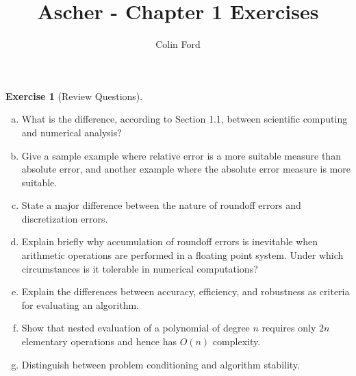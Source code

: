 \documentclass[12pt,a4]{article}
\author{Colin Ford}
\title{Ascher - Chapter 1 Exercises}
\date{}
\theoremstyle{definition}
\newtheorem{exercise}{Exercise}
\begin{document}
\maketitle

\begin{exercise}[Review Questions]
	\begin{enumerate}[(a)]
		\item What is the difference, according to Section 1.1, between scientific computing and numerical analysis?
		
		\item Give a sample example where relative error is a more suitable measure than absolute error, and another example where the absolute error measure is more suitable. 
		
		\item State a major difference between the nature of roundoff errors and discretization errors.
		
		\item Explain briefly why accumulation of roundoff errors is inevitable when arithmetic operations are performed in a floating point system. Under which circumstances is it tolerable in numerical computations?
		
		\item Explain the differences between accuracy, efficiency, and robustness as criteria for evaluating an algorithm.
		
		\item Show that nested evaluation of a polynomial of degree $n$ requires only $2n$ elementary operations and hence has $O(n)$ complexity.
		
		\item Distinguish between problem conditioning and algorithm stability.
		
	\end{enumerate}
\end{exercise}
\end{document}
